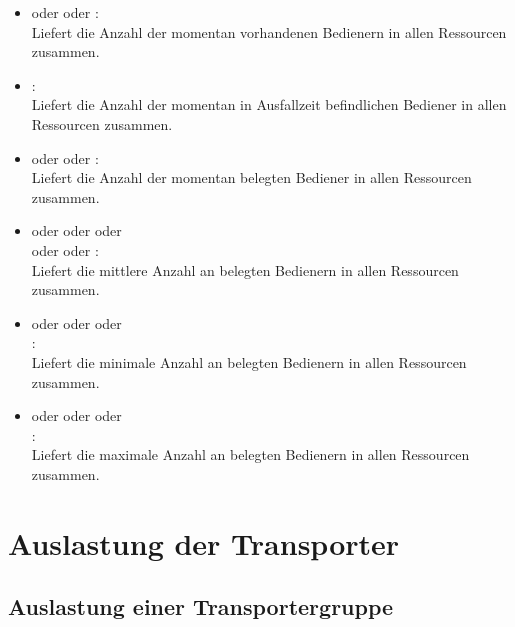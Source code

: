\begin{itemize}

\item
{} oder  oder :\\
Liefert die Anzahl der momentan vorhandenen Bedienern in allen Ressourcen zusammen.

\item
{}:\\
Liefert die Anzahl der momentan in Ausfallzeit befindlichen Bediener in allen Ressourcen zusammen. 

\item
{} oder  oder :\\
Liefert die Anzahl der momentan belegten Bediener in allen Ressourcen zusammen.

\item
{} oder  oder  oder\\
 oder  oder :\\
Liefert die mittlere Anzahl an belegten Bedienern in allen Ressourcen zusammen.

\item
{} oder  oder  oder\\
:\\
Liefert die minimale Anzahl an belegten Bedienern in allen Ressourcen zusammen.

\item
{} oder  oder  oder\\
:\\
Liefert die maximale Anzahl an belegten Bedienern in allen Ressourcen zusammen.

\end{itemize}  



\section{Auslastung der Transporter}



\subsection{Auslastung einer Transportergruppe}


